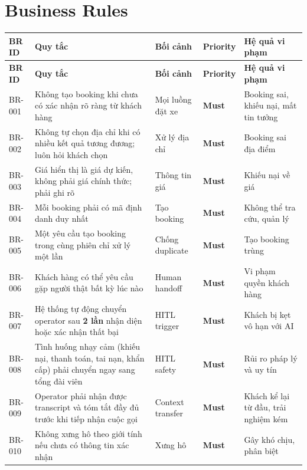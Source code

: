 \documentclass[12pt,a4paper]{article}
\newcommand{\musthave}{\colorbox{PrioMust}{\small\textbf{Must}}}
\begin{document}
\section{Business Rules}

\begin{longtable}{C{1.5cm} L{4.5cm} L{3.5cm} C{1.8cm} L{4cm}}
  \toprule
  \textbf{BR ID}&\textbf{Quy tắc}&\textbf{Bối cảnh}&\textbf{Priority}&\textbf{Hệ quả vi phạm}\\
  \midrule\endfirsthead\toprule{}\textbf{BR ID}&\textbf{Quy tắc}&\textbf{Bối cảnh}&\textbf{Priority}&\textbf{Hệ quả vi phạm}\\\midrule\endhead\bottomrule\endlastfoot
  BR-001 & Không tạo booking khi chưa có xác nhận rõ ràng từ khách hàng & Mọi luồng đặt xe & \musthave & Booking sai, khiếu nại, mất tin tưởng \\
  BR-002 & Không tự chọn địa chỉ khi có nhiều kết quả tương đương; luôn hỏi khách chọn & Xử lý địa chỉ & \musthave & Booking sai địa điểm \\
  BR-003 & Giá hiển thị là giá dự kiến, không phải giá chính thức; phải ghi rõ & Thông tin giá & \musthave & Khiếu nại về giá \\
  BR-004 & Mỗi booking phải có mã định danh duy nhất & Tạo booking & \musthave & Không thể tra cứu, quản lý \\
  BR-005 & Một yêu cầu tạo booking trong cùng phiên chỉ xử lý một lần & Chống duplicate & \musthave & Tạo booking trùng \\
  BR-006 & Khách hàng có thể yêu cầu gặp người thật bất kỳ lúc nào & Human handoff & \musthave & Vi phạm quyền khách hàng \\
  BR-007 & Hệ thống tự động chuyển operator sau \textbf{2 lần} nhận diện hoặc xác nhận thất bại & HITL trigger & \musthave & Khách bị kẹt vô hạn với AI \\
  BR-008 & Tình huống nhạy cảm (khiếu nại, thanh toán, tai nạn, khẩn cấp) phải chuyển ngay sang tổng đài viên & HITL safety & \musthave & Rủi ro pháp lý và uy tín \\
  BR-009 & Operator phải nhận được transcript và tóm tắt đầy đủ trước khi tiếp nhận cuộc gọi & Context transfer & \musthave & Khách kể lại từ đầu, trải nghiệm kém \\
  BR-010 & Không xưng hô theo giới tính nếu chưa có thông tin xác nhận & Xưng hô & \musthave & Gây khó chịu, phân biệt \\

\end{longtable}
\end{document}
